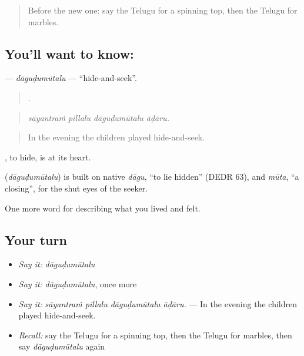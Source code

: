 \label{lesson:TE-C537-dagudumutalu}



\begin{quote}
Before the new one: say the Telugu for a spinning top, then the Telugu for marbles.
\end{quote}

\subsection*{You'll want to know: }
\textbf{} — \emph{dāguḍumūtalu} — \textquotedblleft{}hide-and-seek\textquotedblright{}.

\begin{quote}
   .
\end{quote}

\begin{quote}
\emph{sāyantraṁ pillalu dāguḍumūtalu āḍāru.}
\end{quote}

\begin{quote}
In the evening the children played hide-and-seek.
\end{quote}

, to hide, is at its heart.

\begin{cousinweb}
\textbf{} (\emph{dāguḍumūtalu}) is built on native \emph{dāgu}, \textquotedblleft{}to lie hidden\textquotedblright{} (DEDR 63), and \emph{mūta}, \textquotedblleft{}a closing\textquotedblright{}, for the shut eyes of the seeker.
\end{cousinweb}

\begin{grammarlens}[title={What you've built}]
One more word for describing what you lived and felt.
\end{grammarlens}

\subsection*{Your turn}
\begin{itemize}
\raggedright
  \item \emph{Say it:} \emph{dāguḍumūtalu}
  \item \emph{Say it:} \emph{dāguḍumūtalu}, once more
  \item \emph{Say it:} \emph{sāyantraṁ pillalu dāguḍumūtalu āḍāru.} — In the evening the children played hide-and-seek.
  \item \emph{Recall:} say the Telugu for a spinning top, then the Telugu for marbles, then say \emph{dāguḍumūtalu} again
\end{itemize}

